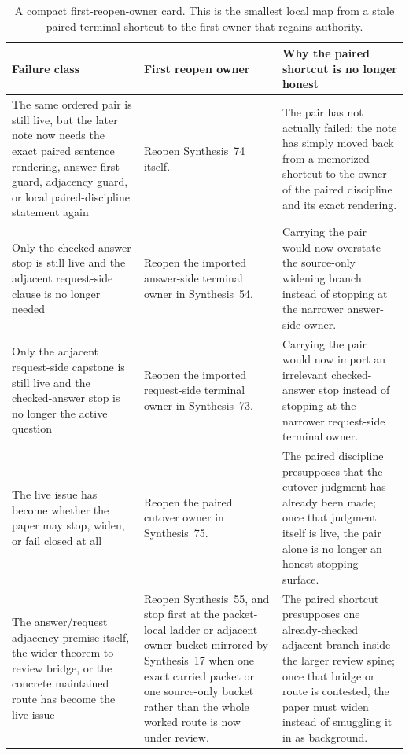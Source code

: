 \documentclass[11pt]{article}
\begin{document}
\begin{table}[t]
\centering
\small
\begin{tabularx}{\linewidth}{@{}L Y Y@{}}
\toprule
Failure class & First reopen owner & Why the paired shortcut is no longer honest \\
\midrule
The same ordered pair is still live, but the later note now needs the exact paired sentence rendering, answer-first guard, adjacency guard, or local paired-discipline statement again & Reopen Synthesis~74 itself. & The pair has not actually failed; the note has simply moved back from a memorized shortcut to the owner of the paired discipline and its exact rendering. \\
Only the checked-answer stop is still live and the adjacent request-side clause is no longer needed & Reopen the imported answer-side terminal owner in Synthesis~54. & Carrying the pair would now overstate the source-only widening branch instead of stopping at the narrower answer-side owner. \\
Only the adjacent request-side capstone is still live and the checked-answer stop is no longer the active question & Reopen the imported request-side terminal owner in Synthesis~73. & Carrying the pair would now import an irrelevant checked-answer stop instead of stopping at the narrower request-side terminal owner. \\
The live issue has become whether the paper may stop, widen, or fail closed at all & Reopen the paired cutover owner in Synthesis~75. & The paired discipline presupposes that the cutover judgment has already been made; once that judgment itself is live, the pair alone is no longer an honest stopping surface. \\
The answer/request adjacency premise itself, the wider theorem-to-review bridge, or the concrete maintained route has become the live issue & Reopen Synthesis~55, and stop first at the packet-local ladder or adjacent owner bucket mirrored by Synthesis~17 when one exact carried packet or one source-only bucket rather than the whole worked route is now under review. & The paired shortcut presupposes one already-checked adjacent branch inside the larger review spine; once that bridge or route is contested, the paper must widen instead of smuggling it in as background. \\
\bottomrule
\end{tabularx}
\caption{A compact first-reopen-owner card. This is the smallest local map from a stale paired-terminal shortcut to the first owner that regains authority.}
\label{tab:paired-terminal-first-reopen-owner-card}
\end{table}
\end{document}
